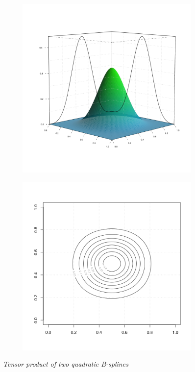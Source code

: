 %
%
\begin{figure}[H]
    \begin{center}
 \begin{subfigure}[t]{0.48\textwidth}
  \centering
  \includegraphics[width=\textwidth]{img/bicubic_basis_function}
  \end{subfigure}
 \begin{subfigure}[t]{.48\textwidth}
  \centering
\includegraphics[width=\textwidth]{img/bicubic_bspline_contour}
 \end{subfigure}
  \caption{\textit{ Tensor product of two quadratic B-splines }}\label{fig:bicubic-bspline-function}
 \end{center}
\end{figure}

